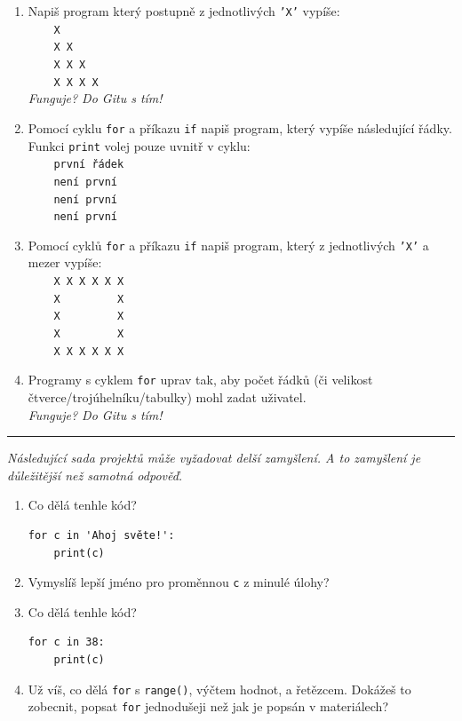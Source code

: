 \documentclass[a4paper,10pt]{article}
\newcommand\startsection[1]{
     \vspace{0.2ex}
    \hrule
    {\fontspec{Oxygen} \tiny
     \vspace{-1ex}
     \emph{#1}
     \vspace{-1.5em}
    }
}
\begin{document}
\begin{enumerate}[resume]
\item Napiš program který postupně z jednotlivých \texttt{'X'} vypíše:
\\\verb+    X+
\\\verb+    X X+
\\\verb+    X X X+
\\\verb+    X X X X+
    \\\emph{\small Funguje? Do Gitu s tím!}

\item Pomocí cyklu \verb+for+ a příkazu \verb+if+ napiš program, který vypíše následující řádky. Funkci \texttt{print} volej pouze uvnitř v cyklu:
\\\verb+    první řádek+
\\\verb+    není první+
\\\verb+    není první+
\\\verb+    není první+

\item Pomocí cyklů \verb+for+ a příkazu \verb+if+ napiš program,
    který z jednotlivých \texttt{'X'} a mezer vypíše:
\\\verb+    X X X X X X+
\\\verb+    X         X+
\\\verb+    X         X+
\\\verb+    X         X+
\\\verb+    X X X X X X+

\item Programy s cyklem \verb+for+ uprav tak, aby počet řádků
    (či velikost čtverce/trojúhelníku/tabulky)
    mohl zadat uživatel.
    \\\emph{\small Funguje? Do Gitu s tím!}

\end{enumerate}

\startsection{Následující sada projektů může vyžadovat delší zamyšlení. A to zamyšlení je důležitější než samotná odpověď.}

\begin{enumerate}[resume]
\item Co dělá tenhle kód?
\begin{verbatim}
for c in 'Ahoj světe!':
    print(c)
\end{verbatim}

\item Vymyslíš lepší jméno pro proměnnou \verb+c+ z minulé úlohy?

\item Co dělá tenhle kód?
\begin{verbatim}
for c in 38:
    print(c)
\end{verbatim}

\item Už víš, co dělá \texttt{for} s \texttt{range()}, výčtem hodnot, a řetězcem.
    Dokážeš to zobecnit, popsat \texttt{for} jednodušeji než jak je popsán v materiálech?

\end{enumerate}
\end{document}
